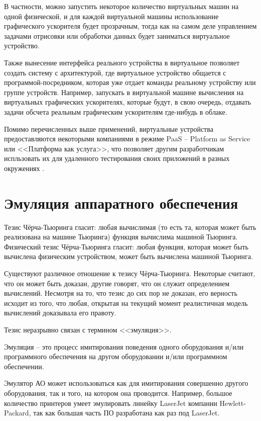 В частности, можно запустить некоторое количество виртуальных машин на одной физической, и для каждой
виртуальной машины использование графического ускорителя будет прозрачным, тогда как на самом
деле управлением задачами отрисовки или обработки данных будет заниматься виртуальное устройство.

Также вынесение интерфейса реального устройства в виртуальное позволяет создать систему с архитектурой,
где виртуальное устройство общается с программой-посредником,
которая уже отдает команды реальному устройству или группе устройств.
Например, запускать в виртуальной машине вычисления на виртуальных графических ускорителях, которые
будут, в свою очередь, отдавать задачи обсчета реальным графическим ускорителям где-нибудь в облаке.

Помимо перечисленных выше применений, виртуальные устройства предоставляются некоторыми компаниями
в режиме PaaS -- Platform as Service или <<Платформа как услуга>>, что позволяет другим разработчикам
испльзовать их для удаленного тестирования своих приложений в разных окружениях \cite{lambdatest,genymotion}.


\section{Эмуляция аппаратного обеспечения}\label{sec:ch1/sec1}

Тезис Чёрча-Тьюринга гласит: любая вычислимая (то есть та,
которая может быть реализована на машине Тьюринга) функция вычислима машиной Тьюринга.
Физический тезис Чёрча-Тьюринга гласит: любая функция, которая может быть вычислена физическим устройством, может быть вычислена машиной Тьюринга.

Существуют различное отношение к тезису Чёрча-Тьюринга.
Некоторые считают, что он может быть доказан, другие говорят, что он служит определением вычислений.
Несмотря на то, что тезис до сих пор не доказан, его верность исходит из того, что любая, открытая на текущий момент
реалистичная модель вычислений доказывала его правоту.

Тезис неразрывно связан с термином <<эмуляция>>.

Эмуляция -- это процесс имитирования поведения одного оборудования и/или программного обеспечения
на другом оборудовании и/или программном обеспечении.

Эмулятор АО может использоваться как для имитирования совершенно другого оборудования, так и того, на котором она проводится.
Например, большое количество принтеров умеет эмулировать линейку LaserJet компании Hewlett-Packard,
так как большая часть ПО разработана как раз под LaserJet.

